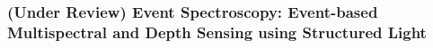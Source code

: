 \subsubsection{(Under Review) Event Spectroscopy: Event-based Multispectral and Depth Sensing using Structured Light}


